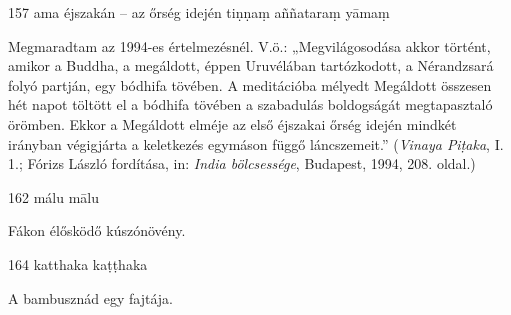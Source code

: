 
\begin{notesdescription}

\item[{157}
{ama éjszakán – az őrség idején}
{tiṇṇaṃ aññataraṃ yāmaṃ}] \hfill\par

Megmaradtam az 1994-es értelmezésnél. V.ö.: „Megvilágosodása akkor történt, amikor a Buddha, a megáldott, éppen Uruvélában tartózkodott, a Nérandzsará folyó partján, egy bódhifa tövében. A meditációba mélyedt Megáldott összesen hét napot töltött el a bódhifa tövében a szabadulás boldogságát megtapasztaló örömben. Ekkor a Megáldott elméje az első éjszakai őrség idején mindkét irányban végigjárta a keletkezés egymáson függő láncszemeit.” (\textit{Vinaya Piṭaka}, I. 1.; Fórizs László fordítása, in: \textit{India bölcsessége}, Budapest, 1994, 208. oldal.)

\item[{162}
{málu}
{mālu}] \hfill\par

Fákon élősködő kúszónövény.

\item[{164}
{katthaka}
{kaṭṭhaka}] \hfill\par

A bambusznád egy fajtája.

\end{notesdescription}

